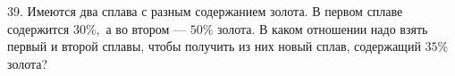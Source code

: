 39. Имеются два сплава с разным содержанием золота. В первом сплаве содержится $30\%,$ а во втором --- $50\%$ золота. В каком отношении надо взять первый и второй сплавы, чтобы получить из них новый сплав, содержащий $35\%$ золота?\\
